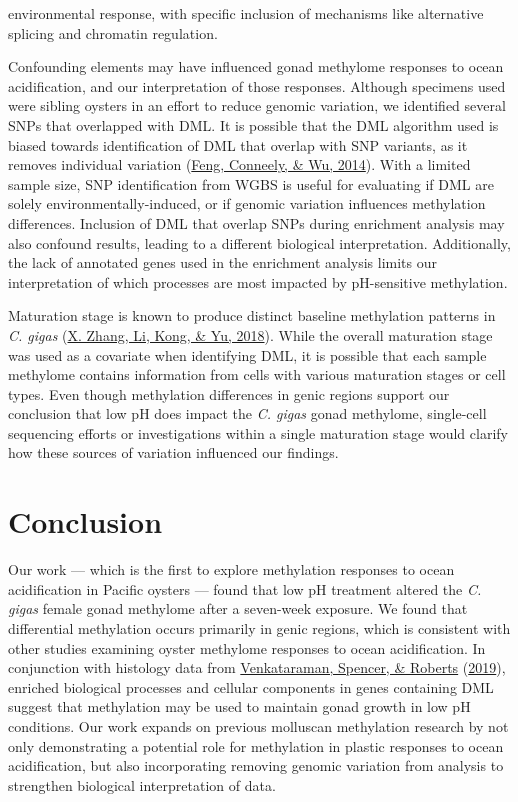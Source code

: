 \documentclass [11pt, proquest] {uwthesis}[2015/03/03]
\begin{document}
environmental response, with specific inclusion of mechanisms like alternative splicing and chromatin regulation.

Confounding elements may have influenced gonad methylome responses to ocean acidification, and our interpretation of those responses. Although specimens used were sibling oysters in an effort to reduce genomic variation, we identified several SNPs that overlapped with DML. It is possible that the DML algorithm used is biased towards identification of DML that overlap with SNP variants, as it removes individual variation (\protect\hyperlink{ref-Feng2014}{Feng, Conneely, \& Wu, 2014}). With a limited sample size, SNP identification from WGBS is useful for evaluating if DML are solely environmentally-induced, or if genomic variation influences methylation differences. Inclusion of DML that overlap SNPs during enrichment analysis may also confound results, leading to a different biological interpretation. Additionally, the lack of annotated genes used in the enrichment analysis limits our interpretation of which processes are most impacted by pH-sensitive methylation.

Maturation stage is known to produce distinct baseline methylation patterns in \emph{C. gigas} (\protect\hyperlink{ref-Zhang2018}{X. Zhang, Li, Kong, \& Yu, 2018}). While the overall maturation stage was used as a covariate when identifying DML, it is possible that each sample methylome contains information from cells with various maturation stages or cell types. Even though methylation differences in genic regions support our conclusion that low pH does impact the \emph{C. gigas} gonad methylome, single-cell sequencing efforts or investigations within a single maturation stage would clarify how these sources of variation influenced our findings.

\hypertarget{conclusion-2}{%
\section{Conclusion}\label{conclusion-2}}

Our work --- which is the first to explore methylation responses to ocean acidification in Pacific oysters --- found that low pH treatment altered the \emph{C. gigas} female gonad methylome after a seven-week exposure. We found that differential methylation occurs primarily in genic regions, which is consistent with other studies examining oyster methylome responses to ocean acidification. In conjunction with histology data from \protect\hyperlink{ref-Venkataraman2019}{Venkataraman, Spencer, \& Roberts} (\protect\hyperlink{ref-Venkataraman2019}{2019}), enriched biological processes and cellular components in genes containing DML suggest that methylation may be used to maintain gonad growth in low pH conditions. Our work expands on previous molluscan methylation research by not only demonstrating a potential role for methylation in plastic responses to ocean acidification, but also incorporating removing genomic variation from analysis to strengthen biological interpretation of data.
\end{document}
